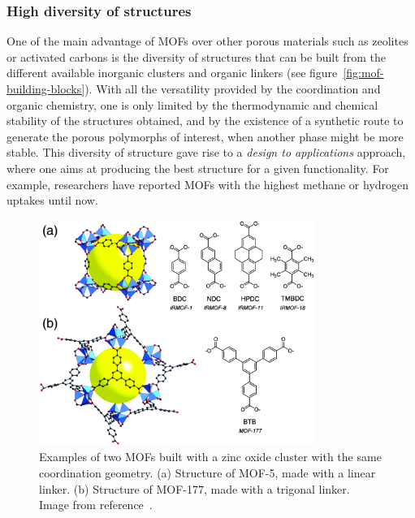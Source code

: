 \documentclass[thesis]{subfiles}
\begin{document}
\afterpage{\clearpage}

\subsubsection{High diversity of structures}

One of the main advantage of MOFs over other porous materials such as zeolites
or activated carbons is the diversity of structures that can be built from the
different available inorganic clusters and organic linkers (see
figure~\ref{fig:mof-building-blocks}). With all the versatility provided by the
coordination and organic chemistry, one is only limited by the thermodynamic and
chemical stability of the structures obtained, and by the existence of a
synthetic route to generate the porous polymorphs of interest, when another
phase might be more stable. This diversity of structure gave rise to a
\emph{design to applications} approach, where one aims at producing the best
structure for a given functionality. For example, researchers have reported MOFs
with the highest methane\cite{Tian2017} or hydrogen\cite{Oh2017} uptakes until
now.


\begin{figure}[ht]
    \centering
    \includegraphics[width=0.8\textwidth]{figures/cited/mof-different-linker}
    \caption{Examples of two MOFs built with a zinc oxide cluster with the same
    coordination geometry. (a) Structure of MOF-5, made with a linear linker.
    (b) Structure of MOF-177, made with a trigonal linker. Image from
    reference~\cite{Rowsell2004}.}
    \label{fig:mof-different-linkers}
\end{figure}
\end{document}
